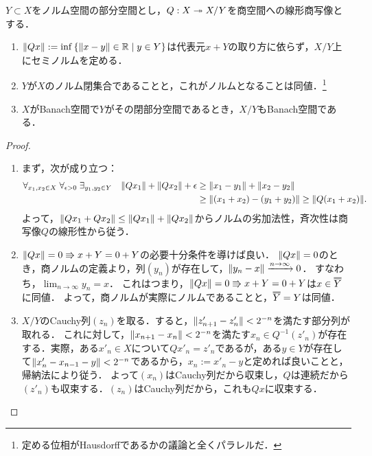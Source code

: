 \documentclass[uplatex,dvipdfmx]{jsreport}
\begin{document}
\begin{proposition}[商空間]\label{prop-quotient-Banach-space}
    $Y\subset X$をノルム空間の部分空間とし，$Q:X\twoheadrightarrow X/Y$を商空間への線形商写像とする．
    \begin{enumerate}
        \item $\|Qx\|:=\inf\left\{\|x-y\|\in\mathbb{R}\mid y\in Y\right\}$は代表元$x+Y$の取り方に依らず，$X/Y$上にセミノルムを定める．
        \item $Y$が$X$のノルム閉集合であることと，これがノルムとなることは同値．\footnote{定める位相がHausdorffであるかの議論と全くパラレルだ．}
        \item $X$がBanach空間で$Y$がその閉部分空間であるとき，$X/Y$もBanach空間である．
    \end{enumerate}
\end{proposition}
\begin{proof}\mbox{}
    \begin{enumerate}
        \item まず，次が成り立つ：
        \begin{align*}
            \forall_{x_1,x_2\in X}\;\forall_{\epsilon>0}\;\exists_{y_1,y_2\in Y}\quad\|Qx_1\|+\|Qx_2\|+\epsilon&\ge\|x_1-y_1\|+\|x_2-y_2\|\\
            &\ge\|(x_1+x_2)-(y_1+y_2)\|\ge\|Q(x_1+x_2)\|.
        \end{align*}
        よって，$\|Qx_1+Qx_2\|\le\|Qx_1\|+\|Qx_2\|$からノルムの劣加法性，斉次性は商写像$Q$の線形性から従う．
        \item $\|Qx\|=0\Rrightarrow x+Y=0+Y$の必要十分条件を導けば良い．
        $\|Qx\|=0$のとき，商ノルムの定義より，列$(y_n)$が存在して，$\|y_n-x\|\xrightarrow{n\to\infty}0$．
        すなわち，$\lim_{n\to\infty}y_n=x$．
        これはつまり，$\|Qx\|=0\Rrightarrow x+Y=0+Y$は$x\in\oo{Y}$に同値．
        よって，商ノルムが実際にノルムであることと，$\oo{Y}=Y$は同値．
        \item $X/Y$のCauchy列$(z_n)$を取る．すると，$\|z'_{n+1}-z'_n\|<2^{-n}$を満たす部分列が取れる．
        これに対して，$\|x_{n+1}-x_n\|<2^{-n}$を満たす$x_n\in Q^{-1}(z'_n)$が存在する．実際，ある$x'_n\in X$について$Qx'_n=z'_n$であるが，ある$y\in Y$が存在して$\|x'_n-x_{n-1}-y\|<2^{-n}$であるから，$x_n:=x'_n-y$と定めれば良いことと，帰納法により従う．
        よって$(x_n)$はCauchy列だから収束し，$Q$は連続だから$(z'_n)$も収束する．$(z_n)$はCauchy列だから，これも$Qx$に収束する．
    \end{enumerate}
\end{proof}
\end{document}
